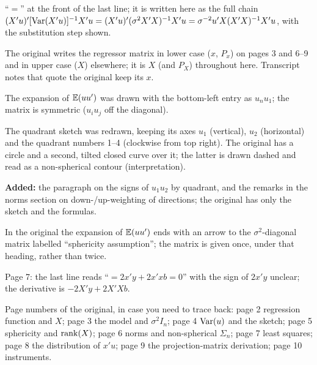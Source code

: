 \documentclass[11pt]{article}
\begin{document}
\begin{transcriptnotes}
        ``$=$'' at the front of the last line; it is written here as the full
        chain $(X'u)'[\operatorname{Var}(X'u)]^{-1}X'u=(X'u)'(\sigma^2X'X)^{-1}X'u
        =\sigma^{-2}u'X(X'X)^{-1}X'u$, with the substitution step shown.
  \item The original writes the regressor matrix in lower case ($x$, $P_x$) on
        pages 3 and 6--9 and in upper case ($X$) elsewhere; it is $X$ (and $P_X$)
        throughout here. Transcript notes that quote the original keep its $x$.
  \item The expansion of $\mathbb{E}(uu')$ was drawn with the bottom-left entry as
        $u_nu_1$; the matrix is symmetric ($u_iu_j$ off the diagonal).
  \item The quadrant sketch was redrawn, keeping its axes $u_1$ (vertical),
        $u_2$ (horizontal) and the quadrant numbers 1--4 (clockwise from top right).
        The original has a circle and a second, tilted closed curve over it; the
        latter is drawn dashed and read as a non-spherical contour (interpretation).
  \item \textbf{Added:} the paragraph on the signs of $u_1u_2$ by quadrant, and the
        remarks in the norms section on down-/up-weighting of directions; the
        original has only the sketch and the formulas.
  \item In the original the expansion of $\mathbb{E}(uu')$ ends with an arrow to the
        $\sigma^2$-diagonal matrix labelled ``sphericity assumption''; the matrix is
        given once, under that heading, rather than twice.
  \item Page 7: the last line reads ``$=2x'y+2x'xb=0$'' with the sign of $2x'y$
        unclear; the derivative is $-2X'y+2X'Xb$.
  \item Page numbers of the original, in case you need to trace back: page 2
        regression function and $X$; page 3 the model and $\sigma^2I_n$; page 4
        $\operatorname{Var}(u)$ and the sketch; page 5 sphericity and $\operatorname{rank}(X)$; page 6 norms
        and non-spherical $\Sigma_n$; page 7 least squares; page 8 the distribution
        of $x'u$; page 9 the projection-matrix derivation; page 10 instruments.
\end{transcriptnotes}
\end{document}
